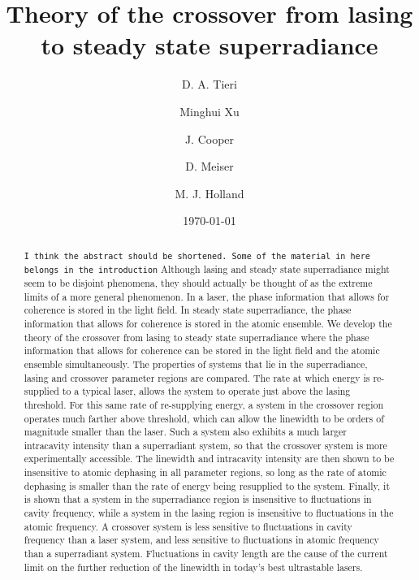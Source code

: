 \documentclass[aps,prl,twocolumn,
superscriptaddress,groupedaddress]{revtex4}
\newcommand{\dmcomment}[1]{{\tt #1}}
\begin{document}
\title{Theory of the crossover from lasing to steady state superradiance}
\author{D. A. Tieri}
\author{Minghui Xu}
\author{J. Cooper}
\author{D. Meiser}
\author{M. J. Holland}
\date{\today}

\begin{abstract}
\dmcomment{I think the abstract should be shortened.  Some of the
  material in here belongs in the introduction}
Although lasing and steady state superradiance might seem to be disjoint
phenomena, they should actually be thought of as the extreme limits of a
more general phenomenon. In a laser, the phase information that allows
for coherence is stored in the light field. In steady state
superradiance, the phase information that allows for coherence is stored
in the atomic ensemble. We develop the theory of the crossover from
lasing to steady state superradiance where the phase information that
allows for coherence can be stored in the light field and the atomic
ensemble simultaneously. The properties of systems that lie in the
superradiance, lasing and crossover parameter regions are compared.
The rate at which energy is re-supplied to a typical laser, allows the
system to operate just above the lasing threshold. For this same rate of
re-supplying energy, a system in the crossover region operates much
farther above threshold, which can allow the linewidth to be orders of
magnitude smaller than the laser. Such a system also exhibits a much
larger intracavity intensity than a superradiant system, so that the
crossover system is more experimentally accessible. The linewidth and
intracavity intensity are then shown to be insensitive to atomic
dephasing in all parameter regions, so long as the rate of atomic
dephasing is smaller than the rate of energy being resupplied to the
system.  Finally, it is shown that a system in the superradiance region
is insensitive to fluctuations in cavity frequency, while a system in
the lasing region is insensitive to fluctuations in the atomic
frequency. A crossover system is less sensitive to fluctuations in
cavity frequency than a laser system, and less sensitive to fluctuations
in atomic frequency than a superradiant system. Fluctuations in cavity
length are the cause of the current limit on the further reduction of
the linewidth in today's best ultrastable lasers.
\end{abstract}
\end{document}
